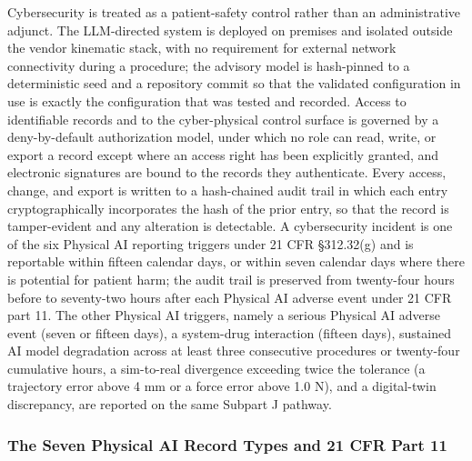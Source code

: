 Cybersecurity is treated as a patient-safety control rather than an administrative
adjunct. The LLM-directed system is deployed on premises and isolated outside the
vendor kinematic stack, with no requirement for external network connectivity during
a procedure; the advisory model is hash-pinned to a deterministic seed and a
repository commit so that the validated configuration in use is exactly the
configuration that was tested and recorded. Access to identifiable records and to
the cyber-physical control surface is governed by a deny-by-default authorization
model, under which no role can read, write, or export a record except where an
access right has been explicitly granted, and electronic signatures are bound to the
records they authenticate. Every access, change, and export is written to a
hash-chained audit trail in which each entry cryptographically incorporates the hash
of the prior entry, so that the record is tamper-evident and any alteration is
detectable. A cybersecurity incident is one of the six Physical AI reporting
triggers under 21 CFR \S 312.32(g) and is reportable within fifteen calendar days,
or within seven calendar days where there is potential for patient harm; the audit
trail is preserved from twenty-four hours before to seventy-two hours after each
Physical AI adverse event under 21 CFR part 11. The other Physical AI triggers,
namely a serious Physical AI adverse event (seven or fifteen days), a system-drug
interaction (fifteen days), sustained AI model degradation across at least three
consecutive procedures or twenty-four cumulative hours, a sim-to-real divergence
exceeding twice the tolerance (a trajectory error above 4 mm or a force error above
1.0 N), and a digital-twin discrepancy, are reported on the same Subpart J pathway.

\subsubsection{The Seven Physical AI Record Types and 21 CFR Part 11}

